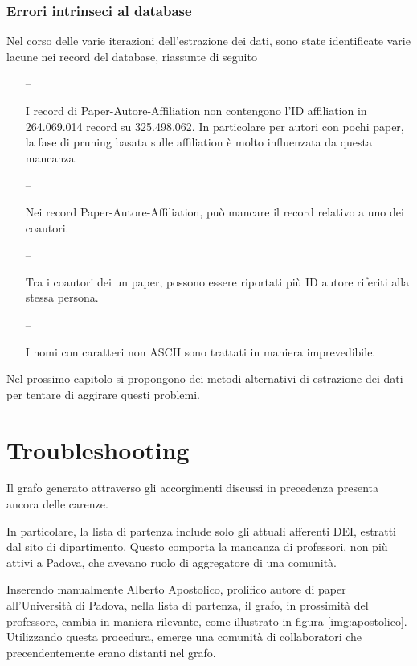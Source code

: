 \documentclass[12pt,a4paper,twoside]{report}
\begin{document}
\subsection{Errori intrinseci al database} \label{ssc:intrinseci}

Nel corso delle varie iterazioni dell'estrazione dei dati, sono state identificate
varie lacune nei record del database, riassunte di seguito

\begin{itemize}
\item[--]

I record di Paper-Autore-Affiliation non contengono l'ID affiliation in 264.069.014 record su
325.498.062. In particolare per autori con pochi paper, la fase di pruning basata sulle
affiliation è molto influenzata da questa mancanza.

\item[--]

Nei record Paper-Autore-Affiliation, può mancare il record relativo a uno dei coautori.

\item[--]

Tra i coautori dei un paper, possono essere riportati più ID autore riferiti alla stessa persona.

\item[--]

I nomi con caratteri non ASCII sono trattati in maniera imprevedibile.

\end{itemize}

Nel prossimo capitolo si propongono dei metodi alternativi di estrazione dei dati per tentare di
aggirare questi problemi.


\whitePage
\chapter{Troubleshooting} \label{cap:trouble}
Il grafo generato attraverso gli accorgimenti discussi in precedenza presenta ancora delle carenze.


In particolare, la lista di partenza include solo gli attuali afferenti DEI, estratti dal sito di
dipartimento. Questo comporta la mancanza di professori, non più attivi a Padova, che avevano ruolo
di aggregatore di una comunità.

Inserendo manualmente Alberto Apostolico, prolifico autore di paper all'Università di Padova, nella
lista di partenza, il grafo, in prossimità del professore, cambia in maniera rilevante, come
illustrato in figura \ref{img:apostolico}. Utilizzando questa procedura, emerge una comunità di
collaboratori che precendentemente erano distanti nel grafo.
\end{document}

